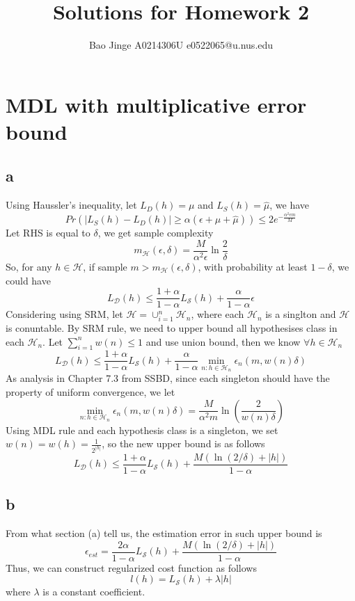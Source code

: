 \documentclass{article}
\author{Bao Jinge A0214306U e0522065@u.nus.edu}
\title{Solutions for Homework 2}
\date{}
\begin{document}
	\maketitle
	\section{MDL with multiplicative error bound}
	\subsection{a}
	Using Haussler's inequality, let $L_D(h)=\mu$ and $L_S(h)=\hat{\mu}$, we have
	$$
	Pr(|L_S(h)-L_D(h)| \geq \alpha(\epsilon+\mu+\hat{\mu})) \leq 2e^{-\frac{\alpha^2\epsilon m}{M}}
	$$
	Let RHS is equal to $\delta$, we get sample complexity
	$$
	m_{\mathcal{H}}(\epsilon,\delta)=\frac{M}{\alpha^2\epsilon}\ln{\frac{2}{\delta}}
	$$
	So, for any $h \in \mathcal{H}$, if sample $m > m_{\mathcal{H}}(\epsilon,\delta)$, with probability at least $1-\delta$, we could have
	$$
	L_{\mathcal{D}}(h) \leq \frac{1+\alpha}{1-\alpha}L_{\mathcal{S}}(h)+\frac{\alpha}{1-\alpha}\epsilon
	$$
	Considering using SRM, let $\mathcal{H}=\cup_{i=1}^{n}\mathcal{H}_n$, where each $\mathcal{H}_n$ is a singlton and $\mathcal{H}$ is conuntable.
	By SRM rule, we need to upper bound all hypothesises class in each $\mathcal{H}_n$. Let $\sum_{i=1}^{n}w(n) \leq1$ and use union bound, then we know $\forall h \in \mathcal{H}_n$
	$$
	L_{\mathcal{D}}(h) \leq \frac{1+\alpha}{1-\alpha}L_{\mathcal{S}}(h)+\frac{\alpha}{1-\alpha}\min_{n:h\in \mathcal{H}_n}\epsilon_n(m,w(n)\delta)
	$$
	As analysis in Chapter 7.3 from SSBD, since each singleton should have the property of  uniform convergence, we let
	$$
	\min_{n:h\in \mathcal{H}_n}\epsilon_n(m,w(n)\delta)=\frac{M}{\alpha^2m}\ln(\frac{2}{w(n)\delta})
	$$
	Using MDL rule and each hypothesis class is a singleton, we set $w(n)=w(h)=\frac{1}{2^{|h|}}$, so the new upper bound is as follows
	$$
	L_{\mathcal{D}}(h) \leq \frac{1+\alpha}{1-\alpha}L_{\mathcal{S}}(h)+\frac{M(\ln(2/\delta)+|h|)}{1-\alpha}
	$$

	

	\subsection{b}
	From what section (a) tell us, the estimation error in such upper bound is
	$$
	\epsilon_{est}=\frac{2\alpha}{1-\alpha}L_{\mathcal{S}}(h)+\frac{M(\ln(2/\delta)+|h|)}{1-\alpha}
	$$
	Thus, we can construct regularized cost function as follows
	$$
	l(h) = L_{\mathcal{S}}(h) + \lambda|h|
	$$
	where $\lambda$ is a constant coefficient.
\end{document}
